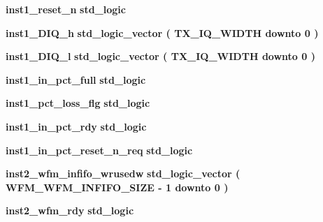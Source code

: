 \begin{DoxyCompactItemize}
{\bf inst1\+\_\+reset\+\_\+n} {\bfseries \textcolor{comment}{std\+\_\+logic}\textcolor{vhdlchar}{ }} 
\item 
{\bf inst1\+\_\+\+D\+I\+Q\+\_\+h} {\bfseries \textcolor{comment}{std\+\_\+logic\+\_\+vector}\textcolor{vhdlchar}{ }\textcolor{vhdlchar}{(}\textcolor{vhdlchar}{ }\textcolor{vhdlchar}{ }\textcolor{vhdlchar}{ }\textcolor{vhdlchar}{ }{\bfseries {\bf T\+X\+\_\+\+I\+Q\+\_\+\+W\+I\+D\+TH}} \textcolor{vhdlchar}{ }\textcolor{keywordflow}{downto}\textcolor{vhdlchar}{ }\textcolor{vhdlchar}{ } \textcolor{vhdldigit}{0} \textcolor{vhdlchar}{ }\textcolor{vhdlchar}{)}\textcolor{vhdlchar}{ }} 
\item 
{\bf inst1\+\_\+\+D\+I\+Q\+\_\+l} {\bfseries \textcolor{comment}{std\+\_\+logic\+\_\+vector}\textcolor{vhdlchar}{ }\textcolor{vhdlchar}{(}\textcolor{vhdlchar}{ }\textcolor{vhdlchar}{ }\textcolor{vhdlchar}{ }\textcolor{vhdlchar}{ }{\bfseries {\bf T\+X\+\_\+\+I\+Q\+\_\+\+W\+I\+D\+TH}} \textcolor{vhdlchar}{ }\textcolor{keywordflow}{downto}\textcolor{vhdlchar}{ }\textcolor{vhdlchar}{ } \textcolor{vhdldigit}{0} \textcolor{vhdlchar}{ }\textcolor{vhdlchar}{)}\textcolor{vhdlchar}{ }} 
\item 
{\bf inst1\+\_\+in\+\_\+pct\+\_\+full} {\bfseries \textcolor{comment}{std\+\_\+logic}\textcolor{vhdlchar}{ }} 
\item 
{\bf inst1\+\_\+pct\+\_\+loss\+\_\+flg} {\bfseries \textcolor{comment}{std\+\_\+logic}\textcolor{vhdlchar}{ }} 
\item 
{\bf inst1\+\_\+in\+\_\+pct\+\_\+rdy} {\bfseries \textcolor{comment}{std\+\_\+logic}\textcolor{vhdlchar}{ }} 
\item 
{\bf inst1\+\_\+in\+\_\+pct\+\_\+reset\+\_\+n\+\_\+req} {\bfseries \textcolor{comment}{std\+\_\+logic}\textcolor{vhdlchar}{ }} 
\item 
{\bf inst2\+\_\+wfm\+\_\+infifo\+\_\+wrusedw} {\bfseries \textcolor{comment}{std\+\_\+logic\+\_\+vector}\textcolor{vhdlchar}{ }\textcolor{vhdlchar}{(}\textcolor{vhdlchar}{ }\textcolor{vhdlchar}{ }\textcolor{vhdlchar}{ }\textcolor{vhdlchar}{ }{\bfseries {\bf W\+F\+M\+\_\+\+W\+F\+M\+\_\+\+I\+N\+F\+I\+F\+O\+\_\+\+S\+I\+ZE}} \textcolor{vhdlchar}{-\/}\textcolor{vhdlchar}{ } \textcolor{vhdldigit}{1} \textcolor{vhdlchar}{ }\textcolor{keywordflow}{downto}\textcolor{vhdlchar}{ }\textcolor{vhdlchar}{ } \textcolor{vhdldigit}{0} \textcolor{vhdlchar}{ }\textcolor{vhdlchar}{)}\textcolor{vhdlchar}{ }} 
\item 
{\bf inst2\+\_\+wfm\+\_\+rdy} {\bfseries \textcolor{comment}{std\+\_\+logic}\textcolor{vhdlchar}{ }} 

\end{DoxyCompactItemize}
